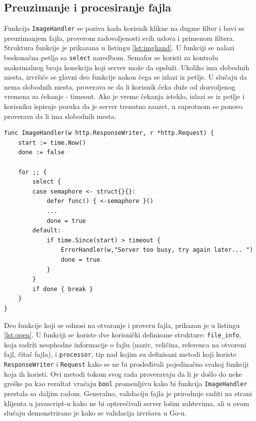 \documentclass[12pt,oneside]{memoir}
\begin{document}
\subsection{Preuzimanje i procesiranje fajla}

Funkcija \texttt{ImageHandler} se poziva kada korisnik klikne na dugme filter i bavi se preuzimanjem fajla, proverom zadovoljenosti svih uslova i primenom filtera. Struktura funkcije je prikazana u listingu \ref{lst:imghand}. U funkciji se nalazi beskonačna petlja sa \texttt{select} naredbom. Semafor se koristi za kontrolu maksimalnog broja konekcija koji server može da opsluži. Ukoliko ima slobodnih mesta, izvršiće se glavni deo funkcije nakon čega se izlazi iz petlje. U slučaju da nema slobodnih mesta, proverava se da li korisnik čeka duže od dozvoljenog vremena za čekanje - timeout.  Ako je vreme čekanja isteklo, izlazi se iz petlje i korisniku ispisuje poruka da je server trenutno zauzet, u suprotnom se ponovo proverava da li ima slobodnih mesta. 
 
\begin{center}
\begin{lstlisting}[caption=Struktura ImageHandler funkcije,label={lst:imghand},float,  backgroundcolor=\color{background}]
func ImageHandler(w http.ResponseWriter, r *http.Request) {
	start := time.Now()
	done := false

	for ;; {
		select {
		case semaphore <- struct{}{}:
			defer func() { <-semaphore }()
			...
			done = true
		default:
			if time.Since(start) > timeout {
				ErrorHandler(w,"Server too busy, try again later... ")
				done = true
			}
		}
		if done { break }
	}
}

\end{lstlisting}
\end{center}

Deo funkcije koji se odnosi na otvaranje i proveru fajla, prikazan je u listingu \ref{lst:open}. U funkciji se koriste dve korisnički definisane strukture: \texttt{file\_info}, koja sadrži neophodne informacije o fajlu (naziv, veličina, referenca na otvoreni fajl, čitač fajla), i \texttt{processor}, tip nad kojim su definisani metodi koji koriste \texttt{ResponseWriter} i \texttt{Request} kako se ne bi prosleđivali pojedinačno svakoj funkciji koja ih koristi. Ovi metodi tokom svog rada proveravaju da li je došlo do neke greške pa kao rezultat vraćaju \texttt{bool} promenljivu kako bi funkcija \texttt{ImageHandler} prestala sa daljim radom. Generalno, validaciju fajla je prirodnije raditi na strani klijenta u javascript-u kako ne bi opterećivali server lošim zahtevima, ali u ovom slučaju demonstrirano je kako se validacija izvršava u Go-u.
\end{document}
